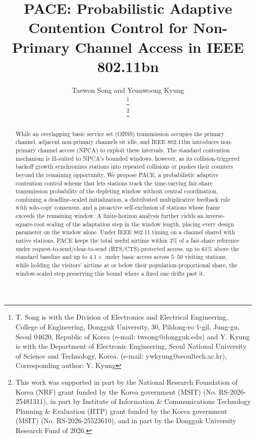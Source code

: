 \documentclass[journal,10pt]{IEEEtran}
\begin{document}
\title{PACE: Probabilistic Adaptive Contention Control for Non-Primary Channel Access in IEEE 802.11bn}

\author{Taewon Song and Yeunwoong Kyung

\thanks{T. Song is with the Division of Electronics and Electrical Engineering, College of Engineering, Dongguk University, 30, Pildong-ro 1-gil, Jung-gu, Seoul 04620, Republic of Korea (e-mail: twsong@dongguk.edu) and Y. Kyung is with the Department of Electronic Engineering, Seoul National University of Science and Technology,
Korea. (e-mail: ywkyung@seoultech.ac.kr), Corresponding author: Y. Kyung}%

\thanks{This work was supported in part by the National Research Foundation of Korea (NRF) grant funded by the Korea government (MSIT) (No. RS-2026-25481311), in part by Institute of Information \& Communications Technology Planning \& Evaluation (IITP) grant funded by the Korea government (MSIT) (No. RS-2026-25523610), and in part by the Dongguk University Research Fund of 2026.}
}

\maketitle

\begin{abstract}
While an overlapping basic service set (OBSS) transmission occupies the primary channel, adjacent non-primary channels sit idle, and IEEE 802.11bn introduces non-primary channel access (NPCA) to exploit these intervals. The standard contention mechanism is ill-suited to NPCA's bounded windows, however, as its collision-triggered backoff growth synchronizes stations into repeated collisions or pushes their counters beyond the remaining opportunity.
We propose PACE, a probabilistic adaptive contention control scheme that lets stations track the time-varying fair-share transmission probability of the depleting window without central coordination, combining a deadline-scaled initialization, a distributed multiplicative feedback rule with solo-copy consensus, and a proactive self-exclusion of stations whose frame exceeds the remaining window.
A finite-horizon analysis further yields an inverse-square-root scaling of the adaptation step in the window length, placing every design parameter on the window alone.
Under IEEE 802.11 timing on a channel shared with native stations, PACE keeps the total useful airtime within $3\%$ of a fair-share reference under request-to-send/clear-to-send (RTS/CTS)-protected access, up to $61\%$ above the standard baseline and up to $4.1\times$ under basic access across $5$--$50$ visiting stations, while holding the visitors' airtime at or below their population-proportional share, the window-scaled step preserving this bound where a fixed one drifts past it.
\end{abstract}
\end{document}
